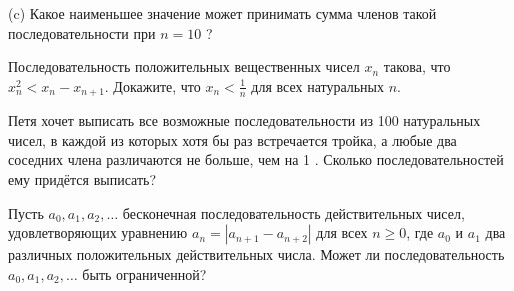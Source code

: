 (c) Какое наименьшее значение может принимать сумма членов такой последовательности при $n=10$ ?

Последовательность положительных вещественных чисел $x_n$ такова, что $x_n^2<x_n-x_{n+1}$. Докажите, что $x_n<\frac{1}{n}$ для всех натуральных $n$.

Петя хочет выписать все возможные последовательности из 100 натуральных чисел, в каждой из которых хотя бы раз встречается тройка, а любые два соседних члена различаются не больше, чем на 1 . Сколько последовательностей ему придётся выписать?

Пусть $a_0, a_1, a_2, \ldots$ бесконечная последовательность действительных чисел, удовлетворяющих уравнению $a_n=\left|a_{n+1}-a_{n+2}\right|$ для всех $n \geqslant 0$, где $a_0$ и $a_1$ два различных положительных действительных числа. Может ли последовательность $a_0, a_1, a_2, \ldots$ быть ограниченной?